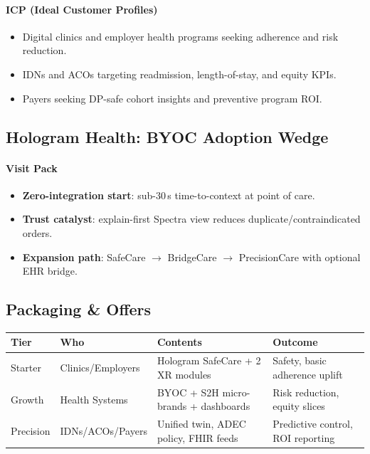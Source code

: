 \documentclass[11pt]{article}
\theoremstyle{plain}
\begin{document}
\paragraph{ICP (Ideal Customer Profiles)}
\begin{itemize}
  \item Digital clinics and employer health programs seeking adherence and risk reduction.
  \item IDNs and ACOs targeting readmission, length-of-stay, and equity KPIs.
  \item Payers seeking DP-safe cohort insights and preventive program ROI.
\end{itemize}

\subsection{Hologram Health: BYOC Adoption Wedge}
\paragraph{Visit Pack}
\begin{itemize}
  \item \textbf{Zero-integration start}: sub-30\,s time-to-context at point of care.
  \item \textbf{Trust catalyst}: explain-first Spectra view reduces duplicate/contraindicated orders.
  \item \textbf{Expansion path}: SafeCare $\rightarrow$ BridgeCare $\rightarrow$ PrecisionCare with optional EHR bridge.
\end{itemize}

\subsection{Packaging \& Offers}
\begin{center}
\begin{tabular}{l l l l}
\hline
\textbf{Tier} & \textbf{Who} & \textbf{Contents} & \textbf{Outcome} \\
\hline
Starter & Clinics/Employers & Hologram SafeCare + 2 XR modules & Safety, basic adherence uplift \\
Growth & Health Systems & BYOC + S2H micro-brands + dashboards & Risk reduction, equity slices \\
Precision & IDNs/ACOs/Payers & Unified twin, ADEC policy, FHIR feeds & Predictive control, ROI reporting \\
\hline
\end{tabular}
\end{center}
\end{document}
